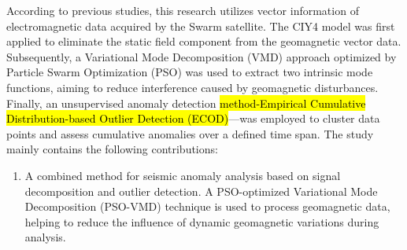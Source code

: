 \documentclass[3p,authoryear,preprint,12pt]{elsarticle}
\begin{document}
{According to previous studies, this research utilizes vector information of electromagnetic data acquired by the Swarm satellite. The CIY4 model was first applied to eliminate the static field component from the geomagnetic vector data. Subsequently, a Variational Mode Decomposition (VMD) approach optimized by Particle Swarm Optimization (PSO) was used to extract two intrinsic mode functions, aiming to reduce interference caused by geomagnetic disturbances. Finally, an unsupervised anomaly detection \hl{method-Empirical Cumulative Distribution-based Outlier Detection (ECOD)}—was employed to cluster data points and assess cumulative anomalies over a defined time span.}
The study mainly contains the following contributions:
\begin{enumerate}
	\item {A combined method for seismic anomaly analysis based on signal decomposition and outlier detection. A PSO-optimized Variational Mode Decomposition (PSO-VMD) technique is used to process geomagnetic data, helping to reduce the influence of dynamic geomagnetic variations during analysis.}
	

\end{enumerate}
\end{document}
